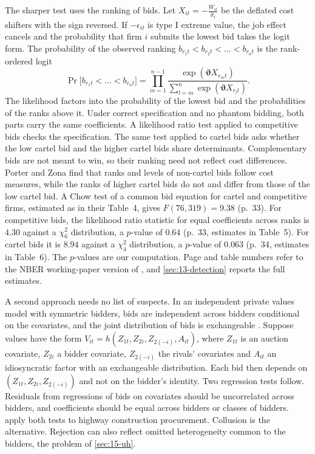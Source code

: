 The sharper test uses the ranking of bids. Let $X_{it}=-\frac{W_{it}}{\hat\sigma_t}$ be the deflated cost
shifters with the sign reversed. If $-\epsilon_{it}$ is type I extreme value, the job effect cancels and the
probability that firm $i$ submits the lowest bid takes the logit form. The probability of the observed
ranking $b_{r_1t}<b_{r_2t}<\dots<b_{r_nt}$ is the rank-ordered logit
\begin{equation}\label{eq:15-pz-rank}
\Pr\bigl[b_{r_1t}<\dots<b_{r_nt}\bigr]=\prod_{m=1}^{n-1}\frac{\exp(\bm\vartheta X_{r_mt})}{\sum_{l=m}^{n}\exp(\bm\vartheta X_{r_lt})} .
\end{equation}
The likelihood factors into the probability of the lowest bid and the probabilities of the ranks above it.
Under correct specification and no phantom bidding, both parts carry the same coefficients. A likelihood
ratio test applied to competitive bids checks the specification. The same test applied to cartel bids
asks whether the low cartel bid and the higher cartel bids share determinants. Complementary bids are not
meant to win, so their ranking need not reflect cost differences. Porter and Zona find that ranks and
levels of non-cartel bids follow cost measures, while the ranks of higher cartel bids do not and differ
from those of the low cartel bid. A Chow test of a common bid equation for cartel and competitive firms, estimated as in their Table~4,
gives $F(76,319)=9.38$ (p.~33). For competitive bids, the likelihood ratio statistic for equal coefficients
across ranks is $4.30$ against a $\chi^2_6$ distribution, a $p$-value of $0.64$ (p.~33, estimates in Table~5).
For cartel bids it is $8.94$ against a $\chi^2_4$ distribution, a $p$-value of $0.063$ (p.~34, estimates in
Table~6). The $p$-values are our
computation. Page and table numbers refer to the NBER working-paper version of \citet{PorterZona1993}, and
\cref{sec:13-detection} reports the full estimates.

A second approach needs no list of suspects. In an independent private values model with symmetric
bidders, bids are independent across bidders conditional on the covariates, and the joint distribution of
bids is exchangeable \citep[Section 5.5]{AtheyHaile2007}. Suppose values have the form
$V_{it}=h(Z_{1t},Z_{2i},Z_{2(-i)},A_{it})$, where $Z_{1t}$ is an auction covariate, $Z_{2i}$ a bidder
covariate, $Z_{2(-i)}$ the rivals' covariates and $A_{it}$ an idiosyncratic factor with an exchangeable
distribution. Each bid then depends on $(Z_{1t},Z_{2i},Z_{2(-i)})$ and not on the bidder's identity. Two
regression tests follow. Residuals from regressions of bids on covariates should be uncorrelated across
bidders, and coefficients should be equal across bidders or classes of bidders.
\citet{BajariYe2003} apply both tests to highway construction procurement. Collusion is the alternative.
Rejection can also reflect omitted heterogeneity common to the bidders, the problem of \cref{sec:15-uh}.

